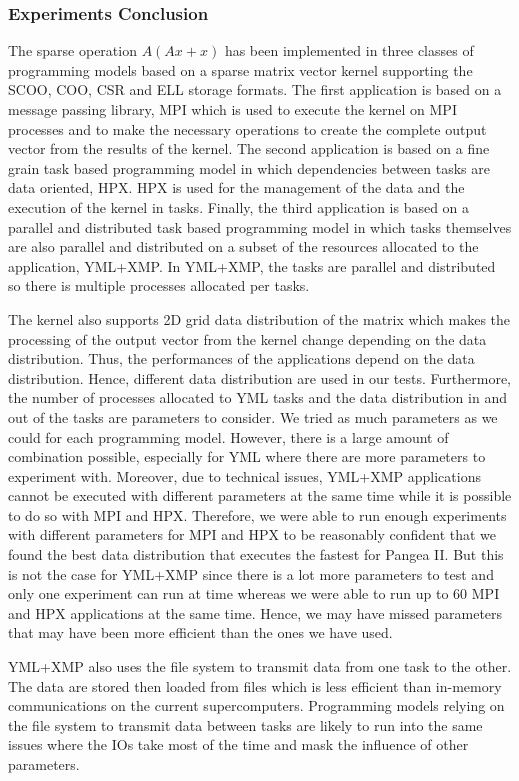 \subsubsection{Experiments Conclusion}
The sparse operation $A(Ax+x)$ has been implemented in three classes of programming models based on a sparse matrix vector kernel supporting the SCOO, COO, CSR and ELL storage formats.
The first application is based on a message passing library, MPI which is used to execute the kernel on MPI processes and to make the necessary operations to create the complete output vector from the results of the kernel.
The second application is based on a fine grain task based programming model in which dependencies between tasks are data oriented, HPX.
HPX is used for the management of the data and the execution of the kernel in tasks.
Finally, the third application is based on a parallel and distributed task based programming model in which tasks themselves are also parallel and distributed on a subset of the resources allocated to the application, YML+XMP.
In YML+XMP, the tasks are parallel and distributed so there is multiple processes allocated per tasks.

The kernel also supports 2D grid data distribution of the matrix which makes the processing of the output vector from the kernel change depending on the data distribution.
Thus, the performances of the applications depend on the data distribution.
Hence, different data distribution are used in our tests.
Furthermore, the number of processes allocated to YML tasks and the data distribution in and out of the tasks are parameters to consider.
We tried as much parameters as we could for each programming model.
However, there is a large amount of combination possible, especially for YML where there are more parameters to experiment with.
Moreover, due to technical issues, YML+XMP applications cannot be executed with different parameters at the same time while it is possible to do so with MPI and HPX.
Therefore, we were able to run enough experiments with different parameters for MPI and HPX to be reasonably confident that we found the best data distribution that executes the fastest for Pangea II.
But this is not the case for YML+XMP since there is a lot more parameters to test and only one experiment can run at time whereas we were able to run up to 60 MPI and HPX applications at the same time.
Hence, we may have missed parameters that may have been more efficient than the ones we have used.

YML+XMP also uses the file system to transmit data from one task to the other.
The data are stored then loaded from files which is less efficient than in-memory communications on the current supercomputers.
Programming models relying on the file system to transmit data between tasks are likely to run into the same issues where the IOs take most of the time and mask the influence of other parameters.

